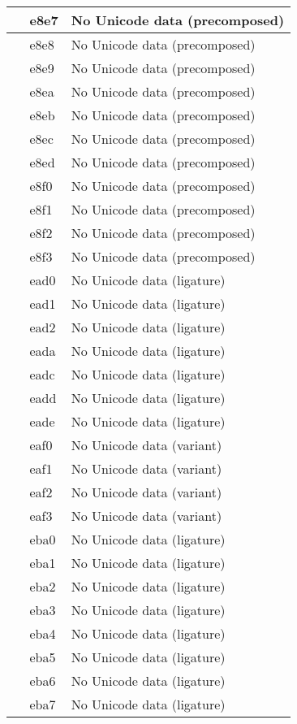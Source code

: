 \documentclass[12pt,letterpaper,openany]{book}
\begin{document}
\begin{center}
\begin{supertabular}{|m{0.25in}|m{0.5in}|m{4in}|}
 & e8e7 & No Unicode data (precomposed)\\\hline
 & e8e8 & No Unicode data (precomposed)\\\hline
 & e8e9 & No Unicode data (precomposed)\\\hline
 & e8ea & No Unicode data (precomposed)\\\hline
 & e8eb & No Unicode data (precomposed)\\\hline
 & e8ec & No Unicode data (precomposed)\\\hline
 & e8ed & No Unicode data (precomposed)\\\hline
 & e8f0 & No Unicode data (precomposed)\\\hline
 & e8f1 & No Unicode data (precomposed)\\\hline
 & e8f2 & No Unicode data (precomposed)\\\hline
 & e8f3 & No Unicode data (precomposed)\\\hline
 & ead0 & No Unicode data (ligature)\\\hline
 & ead1 & No Unicode data (ligature)\\\hline
 & ead2 & No Unicode data (ligature)\\\hline
 & eada & No Unicode data (ligature)\\\hline
 & eadc & No Unicode data (ligature)\\\hline
 & eadd & No Unicode data (ligature)\\\hline
 & eade & No Unicode data (ligature)\\\hline
 & eaf0 & No Unicode data (variant)\\\hline
 & eaf1 & No Unicode data (variant)\\\hline
 & eaf2 & No Unicode data (variant)\\\hline
 & eaf3 & No Unicode data (variant)\\\hline
 & eba0 & No Unicode data (ligature)\\\hline
 & eba1 & No Unicode data (ligature)\\\hline
 & eba2 & No Unicode data (ligature)\\\hline
 & eba3 & No Unicode data (ligature)\\\hline
 & eba4 & No Unicode data (ligature)\\\hline
 & eba5 & No Unicode data (ligature)\\\hline
 & eba6 & No Unicode data (ligature)\\\hline
 & eba7 & No Unicode data (ligature)\\\hline

\end{supertabular}
\end{center}
\end{document}
